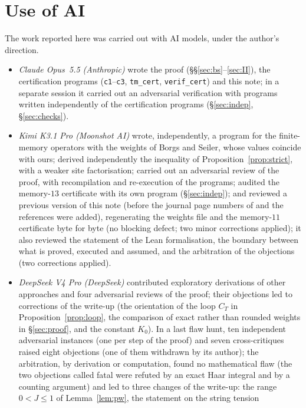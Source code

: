\documentclass[11pt,a4paper]{article}
\theoremstyle{plain}
\theoremstyle{remark}
\numberwithin{equation}{section}
\begin{document}
\section*{Use of AI}\label{sec:ai}
The work reported here was carried out with AI models, under the author's direction.
\begin{itemize}
\item \emph{Claude Opus~5.5 (Anthropic)} wrote the proof (\S\S\ref{sec:bs}--\ref{sec:II}), the certification programs
(\texttt{c1}--\texttt{c3}, \texttt{tm\_cert}, \texttt{verif\_cert}) and this note; in a separate session it carried out an
adversarial verification with programs written independently of the certification programs (\S\ref{sec:indep}, \S\ref{sec:checks}).
\item \emph{Kimi K3.1 Pro (Moonshot AI)} wrote, independently, a program for the finite-memory operators with the weights of Borgs
and Seiler, whose values coincide with ours; derived independently the inequality of Proposition~\ref{prop:strict}, with a weaker
site factorisation; carried out an adversarial review of the proof, with recompilation and re-execution of the programs; audited
the memory-$13$ certificate with its own program (\S\ref{sec:indep}); and reviewed a previous version of this note (before the
journal page numbers of \cite{BS83} and the references \cite{Tom07,IS08} were added), regenerating the weights file and the
memory-$11$ certificate byte for byte (no blocking defect; two minor corrections applied); it also reviewed the statement of the Lean
formalisation, the boundary between what is proved, executed and assumed, and the arbitration of the objections (two corrections applied).
\item \emph{DeepSeek V4 Pro (DeepSeek)} contributed exploratory derivations of other approaches and four adversarial reviews of the
proof; their objections led to corrections of the write-up (the orientation of the loop $C_T$ in Proposition~\ref{prop:loop}, the
comparison of exact rather than rounded weights in \S\ref{sec:proof}, and the constant $K_0$). In a last flaw hunt, ten independent
adversarial instances (one per step of the proof) and seven cross-critiques raised eight objections (one of them withdrawn by its
author); the arbitration, by derivation or computation, found no mathematical flaw (the two objections called fatal were refuted by an exact Haar integral and by a counting
argument) and led to three changes of the write-up: the range $0<J\le1$ of Lemma~\ref{lem:pw}, the statement on the string tension

\end{itemize}
\end{document}
